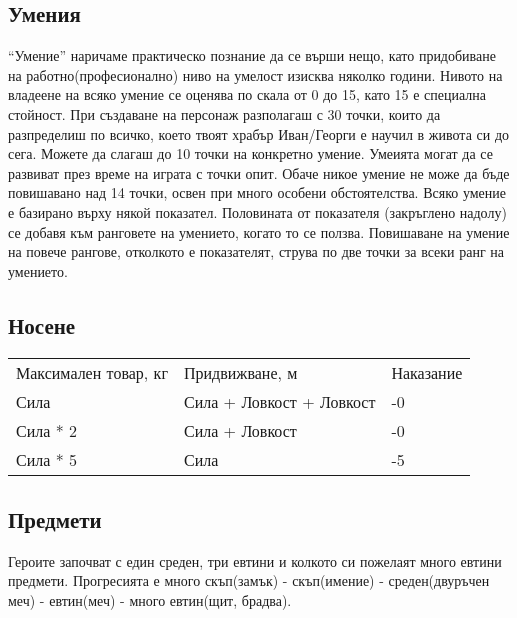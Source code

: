\subsection{Умения}
“Умение” наричаме практическо познание да се върши нещо, като придобиване на работно(професионално) ниво на умелост изисква няколко години.
Нивото на владеене на всяко умение се оценява по скала от 0 до 15, като 15 е специална стойност.
При създаване на персонаж разполагаш с 30 точки, които да разпределиш по всичко, което твоят храбър Иван/Георги е научил в живота си до сега.
Можете да слагаш до 10 точки на конкретно умение.
Умеията могат да се развиват през време на играта с точки опит.
Обаче никое умение не може да бъде повишавано над 14 точки, освен при много особени обстоятелства.
Всяко умение е базирано върху някой показател.
Половината от показателя (закръглено надолу) се добавя към ранговете на умението, когато то се ползва.
Повишаване на умение на повече рангове,  отколкото е показателят, струва по две точки за всеки ранг на умението.

\subsection{Носене}
\begin{tabular}{l | l | l }
Максимален товар, кг & Придвижване, м            & Наказание  \\
Сила                 & Сила + Ловкост + Ловкост  & -0         \\
Сила * 2             & Сила + Ловкост            & -0         \\
Сила * 5             & Сила                      & -5
\end{tabular}


\subsection{Предмети}
Героите започват с един среден, три евтини и колкото си пожелаят много евтини предмети.
Прогресията е много скъп(замък) - скъп(имение) - среден(двуръчен меч) - евтин(меч) - много евтин(щит, брадва).
